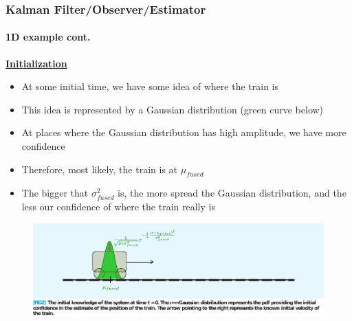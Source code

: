 %





\begin{frame}[plain]\pw\Large
\frametitle{Kalman Filter/Observer/Estimator}
\framesubtitle{1D example \tiny cont.}

\scriptsize

\underline{\textbf{Initialization}}
\begin{itemize}\scriptsize
\item At some initial time, we have some idea of where the train is
\item This idea is represented by a Gaussian distribution (green curve below)
\item At places where the Gaussian distribution has high amplitude, we have more confidence
\item Therefore, most likely, the train is at $\mu_{fused}$
\item The bigger that $\sigma_{fused}^2$ is, the more spread the Gaussian distribution, and the less our confidence of where the train really is
\end{itemize}
\begin{figure}[h]
\centering
\includegraphics[width=1.35\textwidth]{figs/2012_MAG_Understanding_the_Basis_of_the_Kalman_Filter_fig2_mine.pdf}
\end{figure}

\end{frame}


